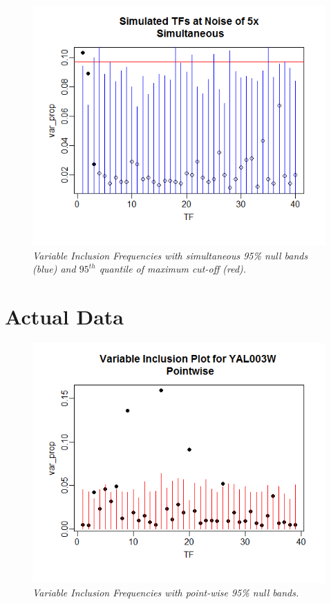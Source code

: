 \documentclass[12pt]{article}
\begin{document}
\begin{figure}[H]
\centerline{\includegraphics[scale=.5]{noise5s}}
\caption{\it Variable Inclusion Frequencies with simultaneous 95\% null bands (blue) and $95^{th}$ quantile of maximum cut-off (red).}\label{fig:f1}  
\end{figure}
\newpage
\section{Actual Data}
\begin{figure}[H]
\centerline{\includegraphics[scale=.5]{gene3p}}
\caption{\it Variable Inclusion Frequencies with point-wise 95\% null bands.}\label{fig:f1}  
\end{figure}
\end{document}
